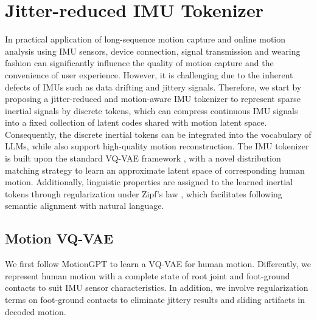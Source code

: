 \section{Jitter-reduced IMU Tokenizer}
\label{sec:method1}
In practical application of long-sequence motion capture and online motion analysis using IMU sensors, device connection, signal transmission and wearing fashion can significantly influence the quality of motion capture and the convenience of user experience. However, it is challenging due to the inherent defects of IMUs such as data drifting and jittery signals. Therefore, we start by proposing a jitter-reduced and motion-aware IMU tokenizer to represent sparse inertial signals by discrete tokens, which can compress continuous IMU signals into a fixed collection of latent codes shared with motion latent space. Consequently, the discrete inertial tokens can be integrated into the vocabulary of LLMs, while also support high-quality motion reconstruction. The IMU tokenizer is built upon the standard VQ-VAE framework \cite{van2017neural}, with a novel distribution matching strategy to learn an approximate latent space of corresponding human motion. Additionally, linguistic properties are assigned to the learned inertial tokens through regularization under Zipf's law \cite{zipf2013psycho}, which facilitates following semantic alignment with natural language.

\subsection{Motion VQ-VAE}
\label{sec:motion_vq}
We first follow MotionGPT \cite{jiang2023motiongpt} to learn a VQ-VAE for human motion. Differently, we represent human motion with a complete state of root joint and foot-ground contacts to suit IMU sensor characteristics. In addition, we involve regularization terms on foot-ground contacts to eliminate jittery results and sliding artifacts in decoded motion.

\vspace{-4mm}

